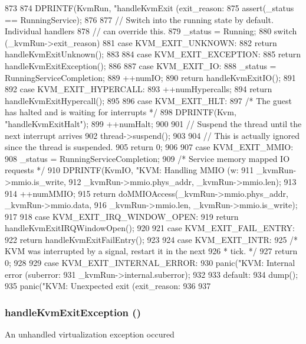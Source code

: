 \begin{DoxyCode}
873 {
874     DPRINTF(KvmRun, "handleKvmExit (exit_reason: %
875     assert(_status == RunningService);
876 
877     // Switch into the running state by default. Individual handlers
878     // can override this.
879     _status = Running;
880     switch (_kvmRun->exit_reason) {
881       case KVM_EXIT_UNKNOWN:
882         return handleKvmExitUnknown();
883 
884       case KVM_EXIT_EXCEPTION:
885         return handleKvmExitException();
886 
887       case KVM_EXIT_IO:
888         _status = RunningServiceCompletion;
889         ++numIO;
890         return handleKvmExitIO();
891 
892       case KVM_EXIT_HYPERCALL:
893         ++numHypercalls;
894         return handleKvmExitHypercall();
895 
896       case KVM_EXIT_HLT:
897         /* The guest has halted and is waiting for interrupts */
898         DPRINTF(Kvm, "handleKvmExitHalt\n");
899         ++numHalt;
900 
901         // Suspend the thread until the next interrupt arrives
902         thread->suspend();
903 
904         // This is actually ignored since the thread is suspended.
905         return 0;
906 
907       case KVM_EXIT_MMIO:
908         _status = RunningServiceCompletion;
909         /* Service memory mapped IO requests */
910         DPRINTF(KvmIO, "KVM: Handling MMIO (w: %
911                 _kvmRun->mmio.is_write,
912                 _kvmRun->mmio.phys_addr, _kvmRun->mmio.len);
913 
914         ++numMMIO;
915         return doMMIOAccess(_kvmRun->mmio.phys_addr, _kvmRun->mmio.data,
916                             _kvmRun->mmio.len, _kvmRun->mmio.is_write);
917 
918       case KVM_EXIT_IRQ_WINDOW_OPEN:
919         return handleKvmExitIRQWindowOpen();
920 
921       case KVM_EXIT_FAIL_ENTRY:
922         return handleKvmExitFailEntry();
923 
924       case KVM_EXIT_INTR:
925         /* KVM was interrupted by a signal, restart it in the next
926          * tick. */
927         return 0;
928 
929       case KVM_EXIT_INTERNAL_ERROR:
930         panic("KVM: Internal error (suberror: %
931               _kvmRun->internal.suberror);
932 
933       default:
934         dump();
935         panic("KVM: Unexpected exit (exit_reason: %
936     }
937 }
\end{DoxyCode}
\hypertarget{classBaseKvmCPU_a9e36bfbe1df222d0ceeaa2f83ad8fa2b}{
\subsubsection[{handleKvmExitException}]{ handleKvmExitException ()}}
\label{classBaseKvmCPU_a9e36bfbe1df222d0ceeaa2f83ad8fa2b}
An unhandled virtualization exception occured

